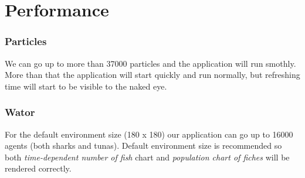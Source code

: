 \section{Performance}
\label{sec:Performance}
\subsubsection{Particles}
We can go up to more than 37000 particles and the application will run smothly.\\
More than that the application will start quickly and run normally, but refreshing time will start to be visible to the naked eye.

\subsubsection{Wator}
For the default environment size (180 x 180) our application can go up to 16000 agents (both sharks and tunas). Default environment size is recommended so both \textit{time-dependent number of fish} chart and \textit{population chart of fiches} will be rendered correctly.
\newpage
